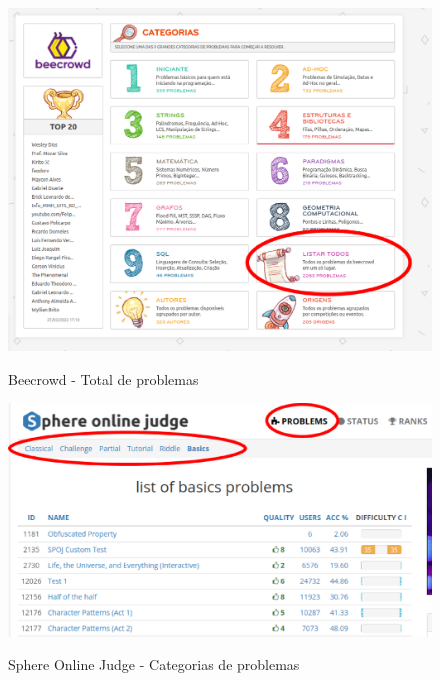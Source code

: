 \begin{anexosenv}
\begin{figure}[H]
    \centering
    \caption{Beecrowd - Total de problemas}
    \includegraphics[keepaspectratio=true,scale=0.4]{figuras/beecrowd_1.eps}
    \label{fig:beecrowd_1}
\end{figure}

\begin{figure}[H]
    \centering
    \caption{Sphere Online Judge - Categorias de problemas}
    \includegraphics[keepaspectratio=true,scale=0.4]{figuras/spoj.eps}
    \label{fig:spoj}
\end{figure}



\end{anexosenv}
